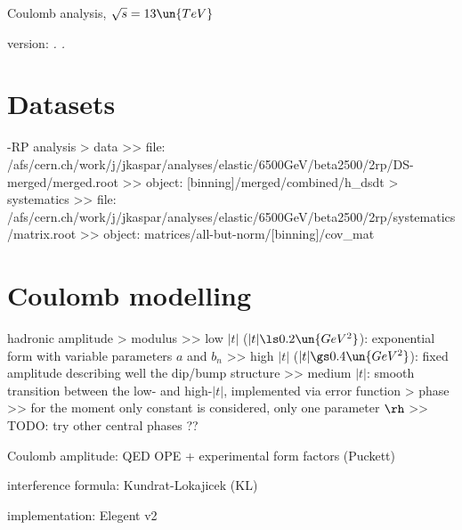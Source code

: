 

\def\baseDir{/afs/cern.ch/work/j/jkaspar/analyses/elastic/6500GeV/combined/coulomb_analysis_1}


\hbox{}
\vskip-10mm

\centerline{\SetFontSizesXX Coulomb analysis, $\sqrt s = 13\un{TeV}$}
\vskip2mm
\centerline{version: {\it \number\day. \number\month. \number\year}}

\vfil
\InsertToc

\vfil
\eject

\BeginText

\chapter[datasets]{Datasets}

-RP analysis
\>> data
\>>> file: /afs/cern.ch/work/j/jkaspar/analyses/elastic/6500GeV/beta2500/2rp/DS-merged/merged.root
\>>> object: [binning]/merged/combined/h\_dsdt
\>> systematics
\>>> file: /afs/cern.ch/work/j/jkaspar/analyses/elastic/6500GeV/beta2500/2rp/systematics/matrix.root
\>>> object: matrices/all-but-norm/[binning]/cov\_mat


\chapter[modelling]{Coulomb modelling}

\> hadronic amplitude
\>> modulus
\>>> low $|t|$ ($|t| \ls 0.2\un{GeV^2}$): exponential form with variable parameters $a$ and $b_n$
\>>> high $|t|$ ($|t| \gs 0.4\un{GeV^2}$): fixed amplitude describing well the dip/bump structure
\>>> medium $|t|$: smooth transition between the low- and high-$|t|$, implemented via error function
\>> phase
\>>> for the moment only constant is considered, only one parameter $\rh$
\>>> TODO: try other central phases ??

\> Coulomb amplitude: QED OPE + experimental form factors (Puckett)

\> interference formula: Kundrat-Lokajicek (KL)

\> implementation: Elegent v2


